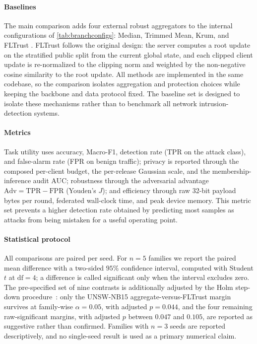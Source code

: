 \documentclass[a4paper,fleqn]{cas-dc}
\begin{document}
\paragraph{Baselines}
\label{sub:baselines}
\par
The main comparison adds four external robust aggregators to the internal configurations of \cref{tab:branchconfigs}: Median, Trimmed Mean, Krum, and FLTrust \cite{cao2021fltrust}. FLTrust follows the original design: the server computes a root update on the stratified public split from the current global state, and each clipped client update is re-normalized to the clipping norm and weighted by the non-negative cosine similarity to the root update.
All methods are implemented in the same codebase, so the comparison isolates aggregation and protection choices while keeping the backbone and data protocol fixed. The baseline set is designed to isolate these mechanisms rather than to benchmark all network intrusion-detection systems.
\par
\paragraph{Metrics} Task utility uses accuracy, Macro-F1, detection rate (TPR on the attack class), and false-alarm rate (FPR on benign traffic); privacy is reported through the composed per-client budget, the per-release Gaussian scale, and the membership-inference audit AUC; robustness through the adversarial advantage $\mathrm{Adv} = \mathrm{TPR} - \mathrm{FPR}$ (Youden's $J$); and efficiency through raw 32-bit payload bytes per round, federated wall-clock time, and peak device memory. This metric set prevents a higher detection rate obtained by predicting most samples as attacks from being mistaken for a useful operating point.
\par
\paragraph{Statistical protocol} All comparisons are paired per seed. For $n=5$ families we report the paired mean difference with a two-sided $95\%$ confidence interval, computed with Student $t$ at $\mathrm{df}=4$; a difference is called significant only when the interval excludes zero. The pre-specified set of nine contrasts is additionally adjusted by the Holm step-down procedure~\cite{holm1979simple}: only the UNSW-NB15 aggregate-versus-FLTrust margin survives at family-wise $\alpha=0.05$, with adjusted $p=0.044$, and the four remaining raw-significant margins, with adjusted $p$ between $0.047$ and $0.105$, are reported as suggestive rather than confirmed. Families with $n=3$ seeds are reported descriptively, and no single-seed result is used as a primary numerical claim.
\par
\end{document}
